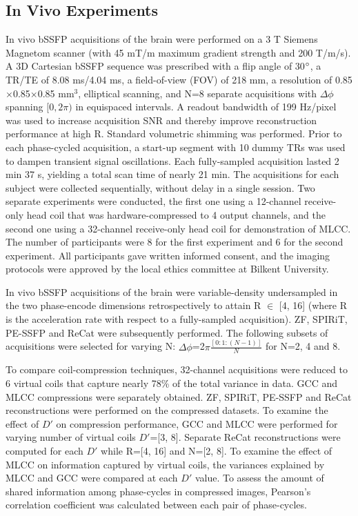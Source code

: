 \documentclass[11pt, onecolumn]{article}
\begin{document}
\subsection*{In Vivo Experiments}
In vivo bSSFP acquisitions of the brain were performed on a 3 T Siemens Magnetom scanner (with 45 mT/m maximum gradient strength and 200 T/m/s). A 3D Cartesian bSSFP sequence was prescribed with a flip angle of 30$\degree$, a TR/TE of 8.08 ms/4.04 ms, a field-of-view (FOV) of 218 mm, a resolution of 0.85$\times$0.85$\times$0.85 mm$^3$, elliptical scanning, and N=8 separate acquisitions with $\Delta\phi$ spanning $[0, 2\pi)$ in equispaced intervals. A readout bandwidth of 199 Hz/pixel was used to increase acquisition SNR and thereby improve reconstruction performance at high R. Standard volumetric shimming was performed. Prior to each phase-cycled acquisition, a start-up segment with 10 dummy TRs was used to dampen transient signal oscillations. Each fully-sampled acquisition lasted 2 min 37 s, yielding a total scan time of nearly 21 min. The acquisitions for each subject were collected sequentially, without delay in a single session. Two separate experiments were conducted, the first one using a 12-channel receive-only head coil that was hardware-compressed to 4 output channels, and the second one using a 32-channel receive-only head coil for demonstration of MLCC. The number of participants were 8 for the first experiment and 6 for the second experiment. All participants gave written informed consent, and the imaging protocols were approved by the local ethics committee at Bilkent University.

In vivo bSSFP acquisitions of the brain were variable-density undersampled in the two phase-encode dimensions retrospectively to attain R $\in$ [4, 16] (where R is the acceleration rate with respect to a fully-sampled acquisition). ZF, SPIRiT, PE-SSFP and ReCat were subsequently performed. The following subsets of acquisitions were selected for varying N: $\Delta\phi $=2$\pi \frac{[0:1:(N-1)]}{N}$ for N=2, 4 and 8.

To compare coil-compression techniques, 32-channel acquisitions were reduced to 6 virtual coils that capture nearly 78\% of the total variance in data. GCC and MLCC compressions were separately obtained. ZF, SPIRiT, PE-SSFP and ReCat reconstructions were performed on the compressed datasets. To examine the effect of $D'$ on compression  performance, GCC and MLCC were performed for varying number of virtual coils $D'$=[3, 8]. Separate ReCat reconstructions were computed for each $D'$ while R=[4, 16] and N=[2, 8]. To examine the effect of MLCC on information captured by virtual coils, the variances explained by MLCC and GCC were compared at each $D'$ value. To assess the amount of shared information among phase-cycles in compressed images, Pearson's correlation coefficient was calculated between each pair of phase-cycles. 
\end{document}
